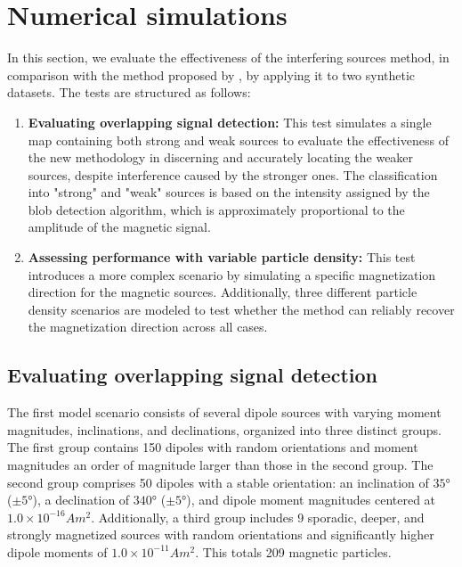 \documentclass[onecolumn,12pt,a4paper]{article}
\begin{document}
\section{Numerical simulations}

In this section, we evaluate the effectiveness of the interfering sources method, in comparison with the method proposed by \citet{Souza-Junior2024}, by applying it to two synthetic datasets. The tests are structured as follows:  

\begin{enumerate}
    \item \textbf{Evaluating overlapping signal detection:} This test simulates a single map containing both strong and weak sources to evaluate the effectiveness of the new methodology in discerning and accurately locating the weaker sources, despite interference caused by the stronger ones. The classification into "strong" and "weak" sources is based on the intensity assigned by the blob detection algorithm, which is approximately proportional to the amplitude of the magnetic signal.

        
    \item \textbf{Assessing performance with variable particle density:} This test introduces a more complex scenario by simulating a specific magnetization direction for the magnetic sources. Additionally, three different particle density scenarios are modeled to test whether the method can reliably recover the magnetization direction across all cases.

\end{enumerate}

\subsection{Evaluating overlapping signal detection}
\label{sec:synthetic-overlapping}

The first model scenario consists of several dipole sources with varying moment magnitudes, inclinations, and declinations, organized into three distinct groups. The first group contains 150 dipoles with random orientations and moment magnitudes an order of magnitude larger than those in the second group. The second group comprises 50 dipoles with a stable orientation: an inclination of \(\ang{35}\) (\(\pm \ang{5}\)), a declination of \(\ang{340}\) (\(\pm \ang{5}\)), and dipole moment magnitudes centered at \(1.0 \times 10^{-16} Am^2\). Additionally, a third group includes 9 sporadic, deeper, and strongly magnetized sources with random orientations and significantly higher dipole moments of \(1.0 \times 10^{-11} Am^2\). This totals 209 magnetic particles.
\end{document}
